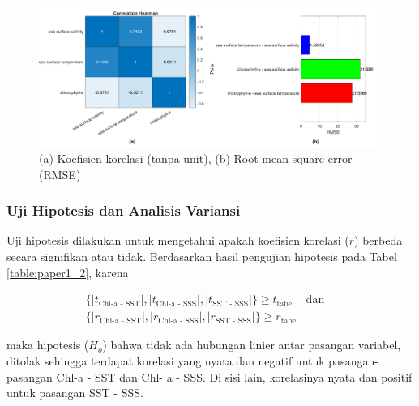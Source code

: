 \begin{spacing}{1.5}
	\begin{figure}[H]
		\centering
		\includegraphics[width=15cm]{contents/final_figure_paper1/gambar_3}
		\caption{(a) Koefisien korelasi (tanpa unit), (b) Root mean square error (RMSE)}
		\label{fig:paper1_3}
	\end{figure}

\subsubsection[Uji Hipotesis dan Analisis Variansi]{Uji Hipotesis dan Analisis Variansi}
	
	Uji hipotesis dilakukan untuk mengetahui apakah koefisien korelasi ($r$) berbeda secara signifikan atau tidak. Berdasarkan hasil pengujian hipotesis pada Tabel \ref{table:paper1_2}, karena 
	
	\begin{equation*}
		\begin{aligned}
			\{|t_{\text{Chl-a - SST}}|,|t_{\text{Chl-a - SSS}}|,|t_{\text{SST - SSS}}|\}\geq t_{\text{tabel}} \quad \text{dan} \quad \\
			\{|r_{\text{Chl-a - SST}}|,|r_{\text{Chl-a - SSS}}|,|r_{\text{SST - SSS}}|\}\geq r_{\text{tabel}} 	
		\end{aligned}	
	\end{equation*} 
	
	maka hipotesis ($H_o$) bahwa tidak ada hubungan linier antar pasangan variabel, ditolak sehingga terdapat korelasi yang nyata dan negatif untuk pasangan-pasangan Chl-a - SST dan Chl- a - SSS. Di sisi lain, korelasinya nyata dan positif untuk pasangan SST - SSS.
	
	\begin{table}[H]
		\centering
		\caption{Uji hipotesis}
		\label{table:paper1_2}
	\end{table}


\end{spacing}
